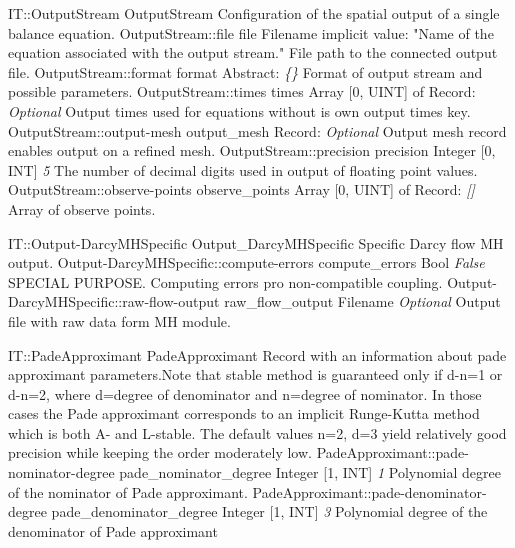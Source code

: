 \begin{RecordType}
	{IT::OutputStream}
	{OutputStream}
	{} %
	{} %
	{{{Configuration of the spatial output of a single balance equation.}}}
		\RecKey
			{OutputStream::file}
			{file}
			{{Filename}}
			{implicit value: "{Name of the equation associated with the output stream.}"}
			{{{File path to the connected output file.}}}
		\RecKey
			{OutputStream::format}
			{format}
			{{Abstract}{: }}
			{ \it{{\{}{\}}} }
			{{{Format of output stream and possible parameters.}}}
		\RecKey
			{OutputStream::times}
			{times}
			{{Array [0, UINT] of }{Record}{: }}
			{ \it{Optional} }
			{{{Output times used for equations without is own output times key.}}}
		\RecKey
			{OutputStream::output-mesh}
			{output{\_}mesh}
			{{Record}{: }}
			{ \it{Optional} }
			{{{Output mesh record enables output on a refined mesh.}}}
		\RecKey
			{OutputStream::precision}
			{precision}
			{{Integer [0, INT]}}
			{ \it{5} }
			{{{The number of decimal digits used in output of floating point values.}}}
		\RecKey
			{OutputStream::observe-points}
			{observe{\_}points}
			{{Array [0, UINT] of }{Record}{: }}
			{ \it{[]} }
			{{{Array of observe points.}}}
\end{RecordType}
\begin{RecordType}
	{IT::Output-DarcyMHSpecific}
	{Output{\_}DarcyMHSpecific}
	{} %
	{} %
	{{{Specific Darcy flow MH output.}}}
		\RecKey
			{Output-DarcyMHSpecific::compute-errors}
			{compute{\_}errors}
			{{Bool}}
			{ \it{False} }
			{{{SPECIAL PURPOSE. Computing errors pro non-compatible coupling.}}}
		\RecKey
			{Output-DarcyMHSpecific::raw-flow-output}
			{raw{\_}flow{\_}output}
			{{Filename}}
			{ \it{Optional} }
			{{{Output file with raw data form MH module.}}}
\end{RecordType}
\begin{RecordType}
	{IT::PadeApproximant}
	{PadeApproximant}
	{} %
	{} %
	{{{Record with an information about pade approximant parameters.Note that stable method is guaranteed only if d-n=1 or d-n=2, where d=degree of denominator and n=degree of nominator. In those cases the Pade approximant corresponds to an implicit Runge-Kutta method which is both A- and L-stable. The default values n=2, d=3 yield relatively good precision while keeping the order moderately low.}}}
		\RecKey
			{PadeApproximant::pade-nominator-degree}
			{pade{\_}nominator{\_}degree}
			{{Integer [1, INT]}}
			{ \it{1} }
			{{{Polynomial degree of the nominator of Pade approximant.}}}
		\RecKey
			{PadeApproximant::pade-denominator-degree}
			{pade{\_}denominator{\_}degree}
			{{Integer [1, INT]}}
			{ \it{3} }
			{{{Polynomial degree of the denominator of Pade approximant}}}
\end{RecordType}
